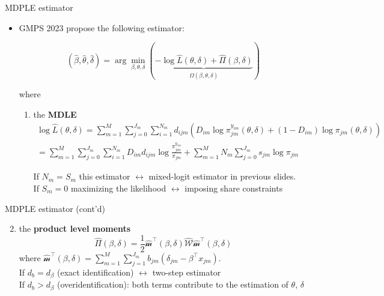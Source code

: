 \documentclass[aspectratio=169,10pt]{beamer}
\begin{document}
\begin{frame}{MDPLE estimator}

    \begin{itemize}
    
        \item GMPS 2023 propose the following estimator:
        
        \begin{equation}
            (\hat{\beta},\hat{\theta},\hat{\delta}) = \arg\min_{\beta,\theta,\delta} (\underbrace{-\log\hat{L}(\theta,\delta)+\hat{\Pi}(\beta,\delta)}_{\hat{\Omega}(\beta,\theta,\delta)})
        \end{equation}
        
        where
        
        \begin{enumerate}
            \item the \textbf{MDLE}
                \begin{align}
                    \log\hat{L}(\theta,\delta) =\sum_{m=1}^M\sum_{j=0}^{J_m}\sum_{i=1}^{N_m} d_{ijm}(D_{im}\log \pi_{jm}^{y_{im}}(\theta,\delta) + (1-D_{im})\log\pi_{jm}(\theta,\delta))\\
                     =\sum_{m=1}^M\sum_{j=0}^{J_m}\sum_{i=1}^{N_m} D_{im} d_{ijm} \log\frac{\pi_{jm}^{y_{im}}}{\pi_{jm}} + \sum_{m=1}^M N_m\sum_{j=0}^{J_m}s_{jm}\log\pi_{jm}
                \end{align}
                
                If $N_m = S_m$ this estimator $\leftrightarrow$ mixed-logit estimator in previous slides.\\
                If $S_m = 0$ maximizing the likelihood $\leftrightarrow$ imposing share constraints
        \end{enumerate}
    \end{itemize}

\end{frame}

\begin{frame}{MDPLE estimator (cont'd)}

    \begin{enumerate}
        \setcounter{enumi}{1}
        \item the \textbf{product level moments}
        \begin{equation}
            \hat{\Pi}(\beta,\delta) = \frac{1}{2}\hat{\mathcal{m}}^\intercal(\beta,\delta)\hat{\mathcal{W}}\hat{\mathcal{m}}^\intercal(\beta,\delta)
        \end{equation}
        where $\hat{\mathcal{m}}^\intercal(\beta,\delta) = \sum_{m=1}^M \sum_{j=1}^{J_m} b_{jm}(\delta_{jm}-\beta^\intercal x_{jm})$.\\
        
        If $d_b = d_\beta$ (exact identification) $\leftrightarrow$ two-step estimator\\
        If $d_b > d_\beta$ (overidentification): both terms contribute to the estimation of $\theta$, $\delta$
    \end{enumerate}
\end{frame}
\end{document}
